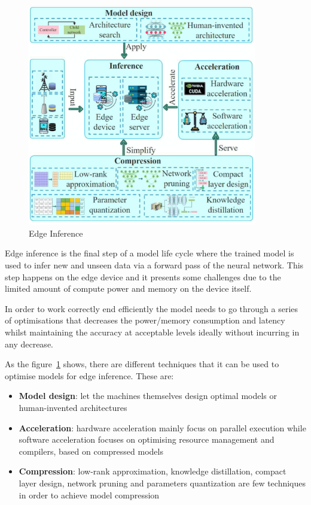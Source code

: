 \begin{figure}[ht]
    \includegraphics[width=10cm]{images/introduction/edge_inference.png}
    \centering
    \caption{Edge Inference}\label{fig:edge_inference}
\end{figure}

Edge inference is the final step of a model life cycle where the trained model
is used to infer new and unseen data via a forward pass of the neural network.
This step happens on the edge device and it presents some challenges due to the
limited amount of compute power and memory on the device itself.

In order to work correctly end efficiently the model needs to go through a
series of optimisations that decreases the power/memory consumption and latency
whilst maintaining the accuracy at acceptable levels \- ideally without
incurring in any decrease.

As the figure~\ref{fig:edge_inference} shows, there are different techniques
that it can be used to optimise models for edge inference. These are:
\begin{itemize}
    \item \textbf{Model design}: let the machines themselves design optimal
        models or human-invented architectures
    \item \textbf{Acceleration}: hardware acceleration mainly focus on parallel
        execution while software acceleration focuses on optimising resource
        management and compilers, based on compressed models
    \item \textbf{Compression}: low-rank approximation, knowledge distillation,
        compact layer design, network pruning and parameters quantization are
        few techniques in order to achieve model compression
\end{itemize}

